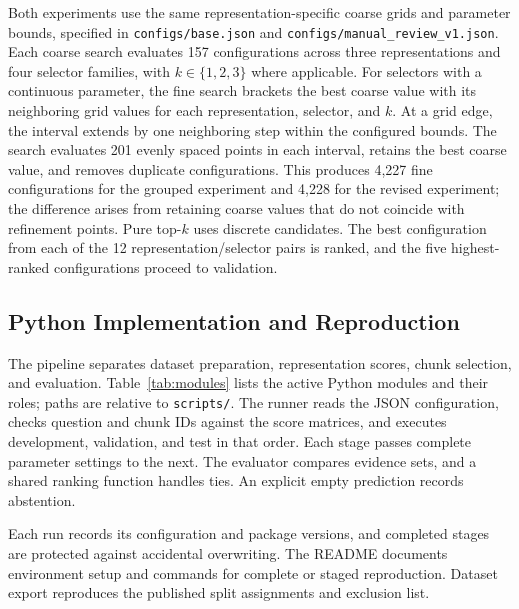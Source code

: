 \documentclass[11pt]{article}
\begin{document}
Both experiments use the same representation-specific coarse grids and parameter bounds, specified in \nolinkurl{configs/base.json} and \nolinkurl{configs/manual_review_v1.json}. Each coarse search evaluates 157 configurations across three representations and four selector families, with $k\in\{1,2,3\}$ where applicable. For selectors with a continuous parameter, the fine search brackets the best coarse value with its neighboring grid values for each representation, selector, and $k$. At a grid edge, the interval extends by one neighboring step within the configured bounds. The search evaluates 201 evenly spaced points in each interval, retains the best coarse value, and removes duplicate configurations. This produces 4,227 fine configurations for the grouped experiment and 4,228 for the revised experiment; the difference arises from retaining coarse values that do not coincide with refinement points. Pure top-$k$ uses discrete candidates. The best configuration from each of the 12 representation/selector pairs is ranked, and the five highest-ranked configurations proceed to validation.

\subsection{Python Implementation and Reproduction}
\label{sec:implementation}

The pipeline separates dataset preparation, representation scores, chunk selection, and evaluation. Table~\ref{tab:modules} lists the active Python modules and their roles; paths are relative to \texttt{scripts/}. The runner reads the JSON configuration, checks question and chunk IDs against the score matrices, and executes development, validation, and test in that order. Each stage passes complete parameter settings to the next. The evaluator compares evidence sets, and a shared ranking function handles ties. An explicit empty prediction records abstention.

Each run records its configuration and package versions, and completed stages are protected against accidental overwriting. The README documents environment setup and commands for complete or staged reproduction. Dataset export reproduces the published split assignments and exclusion list.
\end{document}
